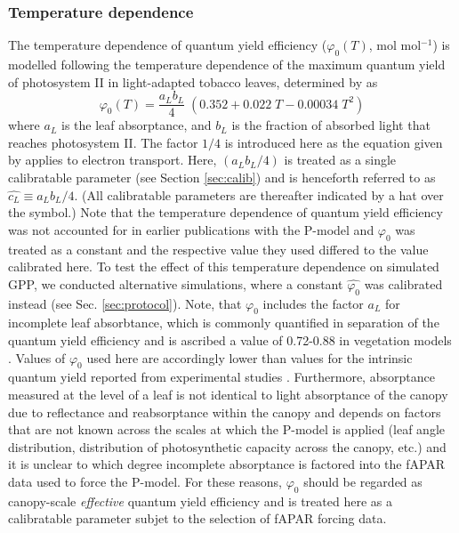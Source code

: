\documentclass{myreport}
\begin{document}
\subsubsection{Temperature dependence}
\label{sec:tempstress}
The temperature dependence of quantum yield efficiency ($\varphi_0(T)$, mol mol$^{-1}$) is modelled following the temperature dependence of the maximum quantum yield of photosystem II in light-adapted tobacco leaves, determined by \cite{bernacchi03pce} as 
\begin{equation}
\label{eq:bernacchi03}
\varphi_0(T) = \frac{a_L b_L}{4} \; ( 0.352 + 0.022\;T - 0.00034\;T^2 )
\end{equation}
where $a_L$ is the leaf absorptance, and $b_L$ is the fraction of absorbed light that reaches photosystem II. The factor $1/4$ is introduced here as the equation given by \cite{bernacchi03pce} applies to electron transport. Here, $(a_L b_L / 4)$ is treated as a single calibratable parameter (see Section \ref{sec:calib}) and is henceforth referred to as $\widehat{c_L}\equiv a_L b_L / 4$. (All calibratable parameters are thereafter indicated by a hat over the symbol.) Note that the temperature dependence of quantum yield efficiency was not accounted for in earlier publications with the P-model \citep{keenan17natcomm, wang17natpl} and $\varphi_0$ was treated as a constant and the respective value they used differed to the value calibrated here. To test the effect of this temperature dependence on simulated GPP, we conducted alternative simulations, where a constant $\widehat{\varphi_0}$ was calibrated instead (see Sec. \ref{sec:protocol}). Note, that $\varphi_0$ includes the factor $a_L$ for incomplete leaf absorbtance, which is commonly quantified in separation of the quantum yield efficiency and is ascribed a value of 0.72-0.88 in vegetation models \citep{rogers17}. Values of $\varphi_0$ used here are accordingly lower than values for the intrinsic quantum yield reported from experimental studies \citep{long93, singsaas01}. Furthermore, absorptance measured at the level of a leaf is not identical to light absorptance of the canopy  due to reflectance and reabsorptance within the canopy and depends on factors that are not known across the scales at which the P-model is applied (leaf angle distribution, distribution of photosynthetic capacity across the canopy, etc.) and it is unclear to which degree incomplete absorptance is factored into the fAPAR data used to force the P-model. For these reasons, $\varphi_0$ should be regarded as canopy-scale \textit{effective} quantum yield efficiency and is treated here as a calibratable parameter subjet to the selection of fAPAR forcing data. 
\end{document}
